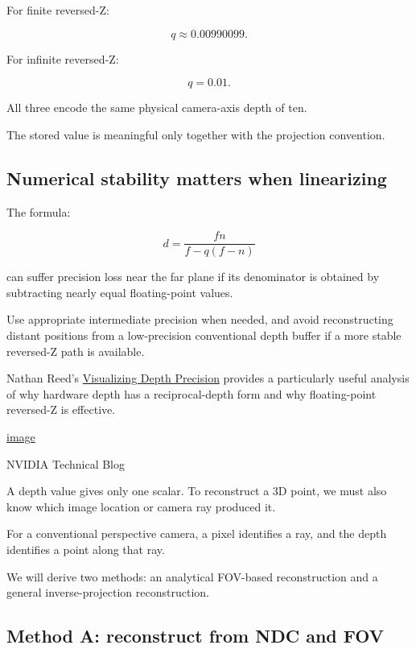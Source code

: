 For finite reversed-Z:

\[ \boxed{q\approx0.00990099}. \]

For infinite reversed-Z:

\[ \boxed{q=0.01}. \]

All three encode the same physical camera-axis depth of ten.

The stored value is meaningful only together with the projection convention.

\subsection{Numerical stability matters when linearizing}\label{02-foundations-ii-ch035-numerical-stability-matters-when-linearizing}

\hypertarget{02-foundations-ii-ch035-numerical-stability-matters-when-linearizing}{}

The formula:

\[ d=\frac{fn}{f-q(f-n)} \]

can suffer precision loss near the far plane if its denominator is obtained by subtracting nearly equal floating-point values.

Use appropriate intermediate precision when needed, and avoid reconstructing distant positions from a low-precision conventional depth buffer if a more stable reversed-Z path is available.

Nathan Reed's \href{https://developer.nvidia.com/blog/visualizing-depth-precision/?utm_source=chatgpt.com}{Visualizing Depth Precision} provides a particularly useful analysis of why hardware depth has a reciprocal-depth form and why floating-point reversed-Z is effective. 

\href{https://www.google.com/s2/favicons?domain=https://developer.nvidia.com&sz=32}{image}

NVIDIA Technical Blog

A depth value gives only one scalar. To reconstruct a 3D point, we must also know which image location or camera ray produced it.

For a conventional perspective camera, a pixel identifies a ray, and the depth identifies a point along that ray.

We will derive two methods: an analytical FOV-based reconstruction and a general inverse-projection reconstruction.

\subsection{Method A: reconstruct from NDC and FOV}\label{02-foundations-ii-ch035-method-a-reconstruct-from-ndc-and-fov}

